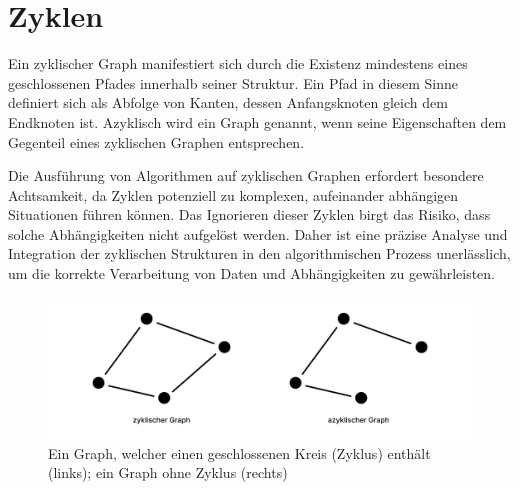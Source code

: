 \section{Zyklen}

Ein zyklischer Graph manifestiert sich durch die Existenz mindestens eines geschlossenen Pfades innerhalb seiner Struktur. Ein Pfad in diesem Sinne definiert sich als Abfolge von Kanten, dessen Anfangsknoten gleich dem Endknoten ist. Azyklisch wird ein Graph genannt, wenn seine Eigenschaften dem Gegenteil eines zyklischen Graphen entsprechen.

Die Ausführung von Algorithmen auf zyklischen Graphen erfordert besondere Achtsamkeit, da Zyklen potenziell zu komplexen, aufeinander abhängigen Situationen führen können. Das Ignorieren dieser Zyklen birgt das Risiko, dass solche Abhängigkeiten nicht aufgelöst werden. Daher ist eine präzise Analyse und Integration der zyklischen Strukturen in den algorithmischen Prozess unerlässlich, um die korrekte Verarbeitung von Daten und Abhängigkeiten zu gewährleisten. \cite{ohlbach2018graphen}

\begin{figure}
    \centering
    \includegraphics[width=1\textwidth]{content/img/Research/Graphen/Zyklen.png}
    \caption{Ein Graph, welcher einen geschlossenen Kreis (Zyklus) enthält (links); ein Graph ohne Zyklus (rechts)}
    \label{fig:zyklen}
\end{figure}
\FloatBarrier